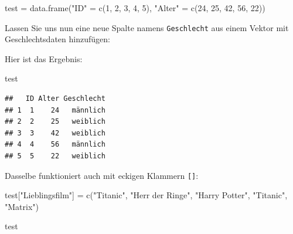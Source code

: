 \documentclass[
]{book}
\newenvironment{Shaded}{\begin{snugshade}}{\end{snugshade}}
\newcommand{\DecValTok}[1]{\textcolor[rgb]{0.00,0.00,0.81}{#1}}
\newcommand{\FunctionTok}[1]{\textcolor[rgb]{0.00,0.00,0.00}{#1}}
\newcommand{\NormalTok}[1]{#1}
\newcommand{\OtherTok}[1]{\textcolor[rgb]{0.56,0.35,0.01}{#1}}
\newcommand{\SpecialCharTok}[1]{\textcolor[rgb]{0.00,0.00,0.00}{#1}}
\newcommand{\StringTok}[1]{\textcolor[rgb]{0.31,0.60,0.02}{#1}}
\begin{document}
\begin{Shaded}
\begin{Highlighting}[]
\NormalTok{test }\OtherTok{=} \FunctionTok{data.frame}\NormalTok{(}\StringTok{"ID"} \OtherTok{=} \FunctionTok{c}\NormalTok{(}\DecValTok{1}\NormalTok{, }\DecValTok{2}\NormalTok{, }\DecValTok{3}\NormalTok{, }\DecValTok{4}\NormalTok{, }\DecValTok{5}\NormalTok{),}
                  \StringTok{"Alter"} \OtherTok{=} \FunctionTok{c}\NormalTok{(}\DecValTok{24}\NormalTok{, }\DecValTok{25}\NormalTok{, }\DecValTok{42}\NormalTok{, }\DecValTok{56}\NormalTok{, }\DecValTok{22}\NormalTok{))}
\end{Highlighting}
\end{Shaded}

Lassen Sie uns nun eine neue Spalte namens \texttt{Geschlecht} aus einem Vektor mit Geschlechtsdaten hinzufügen:

\begin{Shaded}
\end{Shaded}

Hier ist das Ergebnis:

\begin{Shaded}
\begin{Highlighting}[]
\NormalTok{test}
\end{Highlighting}
\end{Shaded}

\begin{verbatim}
##   ID Alter Geschlecht
## 1  1    24   männlich
## 2  2    25   weiblich
## 3  3    42   weiblich
## 4  4    56   männlich
## 5  5    22   weiblich
\end{verbatim}

Dasselbe funktioniert auch mit eckigen Klammern \texttt{{[}{]}}:

\begin{Shaded}
\begin{Highlighting}[]
\NormalTok{test[}\StringTok{"Lieblingsfilm"}\NormalTok{] }\OtherTok{=} \FunctionTok{c}\NormalTok{(}\StringTok{"Titanic"}\NormalTok{, }\StringTok{"Herr der Ringe"}\NormalTok{, }\StringTok{"Harry Potter"}\NormalTok{, }\StringTok{"Titanic"}\NormalTok{, }\StringTok{"Matrix"}\NormalTok{)}

\NormalTok{test}
\end{Highlighting}
\end{Shaded}
\end{document}
